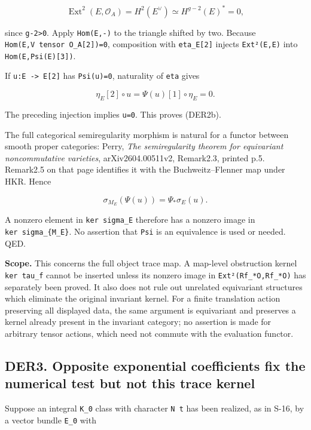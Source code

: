 \documentclass[11pt,a4paper]{article}
\theoremstyle{definition}
\begin{document}
\[
 \operatorname{Ext}^2(E,\mathcal O_A)
 =H^2(E^\vee)
 \simeq H^{g-2}(E)^*=0,
\]

since \texttt{g-2\textgreater{}0}. Apply \texttt{Hom(E,-)} to the
triangle shifted by two. Because
\texttt{Hom(E,V\ tensor\ O\_A{[}2{]})=0}, composition with
\texttt{eta\_E{[}2{]}} injects \texttt{Ext²(E,E)} into
\texttt{Hom(E,Psi(E){[}3{]})}.

If \texttt{u:E\ -\textgreater{}\ E{[}2{]}} has \texttt{Psi(u)=0},
naturality of \texttt{eta} gives

\[
 \eta_E[2]\circ u=\Psi(u)[1]\circ\eta_E=0.
\]

The preceding injection implies \texttt{u=0}. This proves (DER2b).

The full categorical semiregularity morphism is natural for a functor
between smooth proper categories: Perry, \emph{The semiregularity
theorem for equivariant noncommutative varieties}, arXiv2604.00511v2,
Remark2.3, printed p.5. Remark2.5 on that page identifies it with the
Buchweitz--Flenner map under HKR. Hence

\[
 \sigma_{M_E}(\Psi(u))=\Psi_*\sigma_E(u).
\]

A nonzero element in \texttt{ker\ sigma\_E} therefore has a nonzero
image in \texttt{ker\ sigma\_\{M\_E\}}. No assertion that \texttt{Psi}
is an equivalence is used or needed. QED.

\textbf{Scope.} This concerns the full object trace map. A map-level
obstruction kernel \texttt{ker\ tau\_f} cannot be inserted unless its
nonzero image in \texttt{Ext²(Rf\_*O,Rf\_*O)} has separately been
proved. It also does not rule out unrelated equivariant structures which
eliminate the original invariant kernel. For a finite translation action
preserving all displayed data, the same argument is equivariant and
preserves a kernel already present in the invariant category; no
assertion is made for arbitrary tensor actions, which need not commute
with the evaluation functor.

\subsection{DER3. Opposite exponential coefficients fix the numerical
test but not this trace
kernel}\label{der3.-opposite-exponential-coefficients-fix-the-numerical-test-but-not-this-trace-kernel}

Suppose an integral \texttt{K\_0} class with character \texttt{N\ t} has
been realized, as in S-16, by a vector bundle \texttt{E\_0} with
\end{document}
